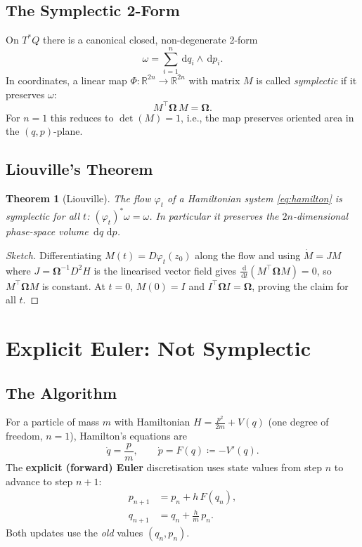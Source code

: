 \documentclass[11pt]{article}
\newtheorem{theorem}{Theorem}[section]
\newcommand{\R}{\mathbb{R}}
\newcommand{\dd}{\,\mathrm{d}}
\newcommand{\Omg}{\boldsymbol{\Omega}} %
\begin{document}
\subsection{The Symplectic 2-Form}

On $T^*Q$ there is a canonical closed, non-degenerate 2-form
\begin{equation}\label{eq:2form}
  \omega = \sum_{i=1}^n \dd q_i \wedge \dd p_i.
\end{equation}
In coordinates, a linear map $\Phi : \R^{2n} \to \R^{2n}$ with matrix $M$
is called \emph{symplectic} if it preserves $\omega$:
\begin{equation}\label{eq:symplectic_condition}
  M^{\top} \Omg\, M = \Omg.
\end{equation}
For $n=1$ this reduces to $\det(M) = 1$, i.e., the map preserves oriented
area in the $(q, p)$-plane.

\subsection{Liouville's Theorem}

\begin{theorem}[Liouville]
  The flow $\varphi_t$ of a Hamiltonian system \eqref{eq:hamilton} is
  symplectic for all $t$: $(\varphi_t)^* \omega = \omega$.  In particular it
  preserves the $2n$-dimensional phase-space volume $\dd q\, \dd p$.
\end{theorem}

\begin{proof}[Sketch]
  Differentiating $M(t) = D\varphi_t(z_0)$ along the flow and using
  $\dot{M} = JM$ where $J = \Omg^{-1} D^2 H$ is the linearised vector field
  gives $\frac{\dd}{\dd t}(M^{\top}\Omg M) = 0$, so $M^{\top}\Omg M$ is
  constant.  At $t=0$, $M(0) = I$ and $I^{\top}\Omg I = \Omg$, proving the
  claim for all $t$.
\end{proof}

\section{Explicit Euler: Not Symplectic}

\subsection{The Algorithm}

For a particle of mass $m$ with Hamiltonian
$H = \tfrac{p^2}{2m} + V(q)$ (one degree of freedom, $n=1$), Hamilton's
equations are
\begin{equation}
  \dot{q} = \frac{p}{m}, \qquad \dot{p} = F(q) \coloneqq -V'(q).
\end{equation}
The \textbf{explicit (forward) Euler} discretisation uses state values from
step $n$ to advance to step $n+1$:
\begin{align}
  p_{n+1} &= p_n + h\, F(q_n), \label{eq:euler_p}\\
  q_{n+1} &= q_n + \frac{h}{m}\, p_n. \label{eq:euler_q}
\end{align}
Both updates use the \emph{old} values $(q_n, p_n)$.
\end{document}
